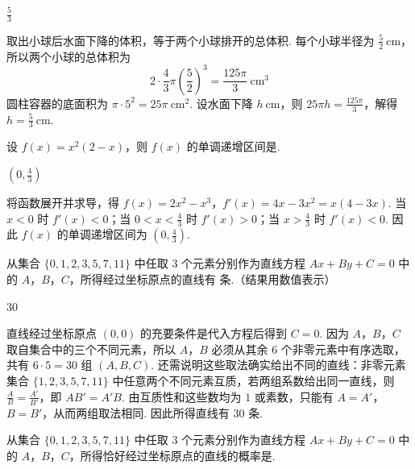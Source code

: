 \begin{answer}
\(\frac{5}{3}\)
\end{answer}

\begin{solution}
取出小球后水面下降的体积，等于两个小球排开的总体积. 每个小球半径为 \(\frac52\mathrm{~cm}\)，所以两个小球的总体积为
\[
2\cdot\frac43\pi\left(\frac52\right)^3=\frac{125\pi}{3}\ \mathrm{cm}^3
\]
圆柱容器的底面积为 \(\pi\cdot5^2=25\pi\ \mathrm{cm}^2\). 设水面下降 \(h\ \mathrm{cm}\)，则 \(25\pi h=\frac{125\pi}{3}\)，解得 \(h=\frac53\ \mathrm{cm}\).
\end{solution}

\reuseproblemnumber
\begin{problem}[B]
设 \(f(x)=x^{2}(2-x)\)，则 \(f(x)\) 的单调递增区间是\fillinblank{}.
\end{problem}

\begin{answer}
\(\left(0,\frac{4}{3}\right)\)
\end{answer}

\begin{solution}
将函数展开并求导，得 \(f(x)=2x^2-x^3\)，\(f'(x)=4x-3x^2=x(4-3x)\). 当 \(x<0\) 时 \(f'(x)<0\)；当 \(0<x<\frac43\) 时 \(f'(x)>0\)；当 \(x>\frac43\) 时 \(f'(x)<0\). 因此 \(f(x)\) 的单调递增区间为 \(\left(0,\frac43\right)\).
\end{solution}

\begin{problem}[A]
从集合 \(\{0,1,2,3,5,7,11\}\) 中任取 \(3\) 个元素分别作为直线方程 \(Ax + By + C = 0\) 中的 \(A\)，\(B\)，\(C\)，所得经过坐标原点的直线有\fillinblank{} 条.（结果用数值表示）
\end{problem}

\begin{answer}
30
\end{answer}

\begin{solution}
直线经过坐标原点 \((0,0)\) 的充要条件是代入方程后得到 \(C=0\). 因为 \(A\)，\(B\)，\(C\) 取自集合中的三个不同元素，所以 \(A\)，\(B\) 必须从其余 \(6\) 个非零元素中有序选取，共有 \(6\cdot5=30\) 组 \((A,B,C)\). 还需说明这些取法确实给出不同的直线：非零元素集合 \(\{1,2,3,5,7,11\}\) 中任意两个不同元素互质，若两组系数给出同一直线，则 \(\frac{A}{B}=\frac{A'}{B'}\)，即 \(AB'=A'B\). 由互质性和这些数均为 \(1\) 或素数，只能有 \(A=A'\)，\(B=B'\)，从而两组取法相同. 因此所得直线有 \(30\) 条.
\end{solution}

\reuseproblemnumber
\begin{problem}[B]
从集合 \(\{0,1,2,3,5,7,11\}\) 中任取 \(3\) 个元素分别作为直线方程 \(Ax + By + C = 0\) 中的 \(A\)，\(B\)，\(C\)，所得恰好经过坐标原点的直线的概率是\fillinblank{}.
\end{problem}

